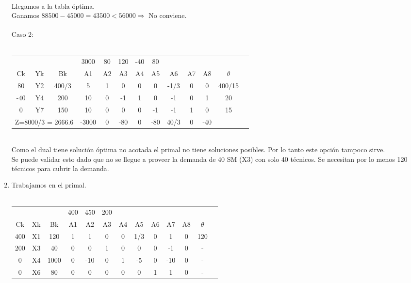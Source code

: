\documentclass{article}
\begin{document}
\begin{enumerate}
\begin{tabular}{|c  c  c | c  c  c  c  c  c  c  c  c | c |}
		\end{tabular}
		\medskip\\
		Llegamos a la tabla \'optima.\\
		Ganamos $88500 - 45000 = 43500 < 56000 \Rightarrow $ No conviene.\\
		\smallskip\\
		Caso 2:\\
     	\smallskip\\
		\begin{tabular}{|c  c  c | c  c  c  c  c  c  c  c  c | c |}
			\hline
			 \multicolumn{3}{|c|}{} & 3000 & 80 & 120 & -40 & 80 & & & & \\ 
			 Ck & Yk & Bk & A1 & A2 & A3 & A4 & A5 & A6 & A7 & A8 & $\theta$\\ \hline 
			 80 & Y2 & 400/3 & 5 & 1 & 0 & 0 & 0 & -1/3 & 0 & 0 & 400/15\\
			 -40 & Y4 & 200 & 10 & 0 & -1 & 1 & 0 & -1 & 0 & 1 & 20\\
			 0 & Y7 & 150 & 10 & 0 & 0 & 0 & -1 & -1 & 1 & 0 & 15\\ \hline
			 \multicolumn{3}{|c|}{Z=8000/3 = 2666.6} & -3000 & 0 & -80 & 0 & -80 & 40/3 & 0 & -40 &\\ \hline
		\end{tabular}
		\medskip\\
	    Como el dual tiene soluci\'on \'optima no acotada el primal no tiene soluciones posibles. Por lo tanto este opci\'on tampoco sirve. 
     	\smallskip\\
	    Se puede validar esto dado que no se llegue a proveer la demanda de 40 SM (X3) con solo 40 t\'ecnicos. Se necesitan por lo menos 120 t\'ecnicos para cubrir la demanda.
		\medskip\\
	\item Trabajamos en el primal.\\
     	\smallskip\\
		\begin{tabular}{|c  c  c | c  c  c  c  c  c  c  c  c | c |}
			\hline
			 \multicolumn{3}{|c|}{} & 400 & 450 & 200 & & & & & & \\ 
			 Ck & Xk & Bk & A1 & A2 & A3 & A4 & A5 & A6 & A7 & A8 & $\theta$\\ \hline 
			 400 & X1 & 120 & 1 & 1 & 0 & 0 & 1/3 & 0 & 1 & 0 & 120\\
			 200 & X3 & 40 & 0 & 0 & 1 & 0 & 0 & 0  & -1 & 0 & -\\
			 0 & X4 & 1000 & 0 & -10 & 0 & 1 & -5 & 0 & -10 & 0 & -\\ 
			 0 & X6 & 80   & 0 & 0   & 0 & 0 & 0  & 1 & 1   & 0 & -\\

\end{tabular}
\end{enumerate}
\end{document}
